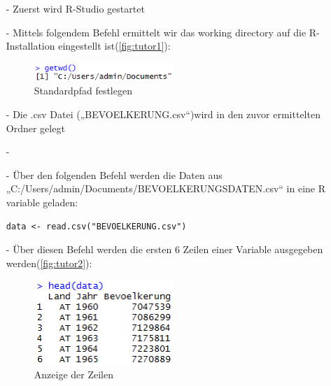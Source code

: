 \begin{itemize}
\item[-]Zuerst wird R-Studio gestartet

\item[-]Mittels folgendem Befehl ermittelt wir das working directory auf die R-Installation eingestellt ist(\autoref{fig:tutor1}):
\begin{figure}[!htb]
        \begin{minipage}{1\textwidth}
                \centering
                \includegraphics[width=0.50\textwidth]{pics/tutor1.png}\par\vspace{0cm}
                \caption{Standardpfad festlegen}
                \label{fig:tutor1}
        \end{minipage}
\end{figure}
	
\item[-]Die .csv Datei („BEVOELKERUNG.csv“)wird in den zuvor ermittelten Ordner gelegt

-\item[-]Über den folgenden Befehl werden die Daten aus „C:/Users/admin/Documents/BEVOELKERUNGSDATEN.csv“ in eine R variable geladen:
\begin{lstlisting}
data <- read.csv("BEVOELKERUNG.csv")
\end{lstlisting}
\item[-]Über diesen Befehl werden die ersten 6 Zeilen einer Variable ausgegeben werden(\autoref{fig:tutor2}):
\begin{figure}[!htb]
        \begin{minipage}{1\textwidth}
                \centering
                \includegraphics[width=0.50\textwidth]{pics/tutor2.png}\par\vspace{0cm}
                \caption{Anzeige der Zeilen}
                \label{fig:tutor2}
        \end{minipage}
\end{figure}


\end{itemize}
